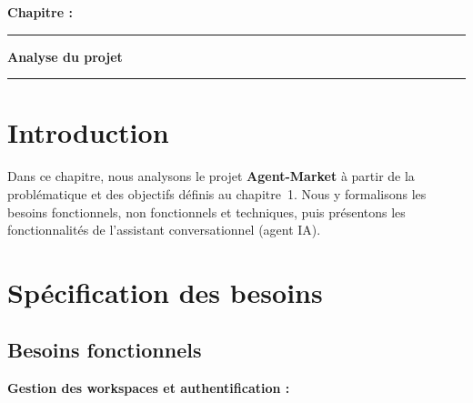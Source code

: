 \documentclass[12pt,a4paper]{report}
\numberwithin{figure}{chapter}
\numberwithin{table}{chapter}
\newcommand{\chapterpagetitle}[1]{%
  \vspace*{1.2cm}%
  {\noindent\fontsize{18}{22}\selectfont\bfseries\color{titlegreen} Chapitre \thechapter :}\par
  \vspace*{6.0cm}%
  \noindent\textcolor{darkgreen}{\rule{\textwidth}{2pt}}%
  \vspace{1.5cm}%
  \begin{center}
    {\fontsize{24}{28}\selectfont\bfseries\color{titlegreen} #1}%
  \end{center}
  \vspace{1.5cm}%
  \noindent\textcolor{darkgreen}{\rule{\textwidth}{2pt}}%
  \vfill
  \newpage
}
\begin{document}
\newpage



\chapterpagetitle{Analyse du projet}



\section{Introduction}

Dans ce chapitre, nous analysons le projet \textbf{Agent-Market} à partir de la problématique et des objectifs définis au chapitre~1. Nous y formalisons les besoins fonctionnels, non fonctionnels et techniques, puis présentons les fonctionnalités de l’assistant conversationnel (agent IA).



\section{Spécification des besoins}

\subsection{Besoins fonctionnels}

\textbf{Gestion des workspaces et authentification :}
\end{document}

